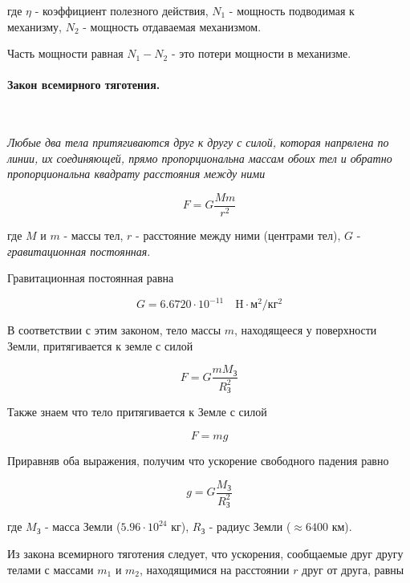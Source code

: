 \documentclass[a4paper,12pt]{article}
\begin{document}
		где $\eta$ - коэффициент полезного действия, $N_1$ - мощность подводимая к механизму, $N_2$ -
		мощность отдаваемая механизмом.

		Часть мощности равная $N_1-N_2$ - это потери мощности в механизме. 


		\paragraph{Закон всемирного тяготения.} \

		\textit{Любые два тела притягиваются друг к другу с силой, которая напрвлена по линии, их
		соединяющей, прямо пропорциональна массам обоих тел и обратно пропорциональна квадрату
		расстояния между ними}

		\begin{equation}
			F = G \frac{Mm}{r^2}
		\end{equation}

		где $M$ и $m$ - массы тел, $r$ - расстояние между ними (центрами тел), 
		$G$ - \textit{гравитационная постоянная}.

		Гравитационная постоянная равна

		\begin{equation*}
			G = 6.6720 \cdot 10^{-11} \quad \text{H} \cdot \text{м}^2 / \text{кг}^2
		\end{equation*}

		В соответствии с этим законом, тело массы $m$, находящееся у поверхности Земли, 
		притягивается к земле с силой

		\begin{equation*}
			F = G \frac{mM_\text{З}}{R^2_\text{З}}
		\end{equation*}

		Также знаем что тело притягивается к Земле с силой

		\begin{equation*}
			F = mg
		\end{equation*}
	
		Приравняв оба выражения, получим что ускорение свободного падения равно

		\begin{equation*}
			g = G \frac{M_\text{З}}{R^2_\text{З}}
		\end{equation*}

		где $M_\text{З}$ - масса Земли ($5.96 \cdot 10^{24}$ кг), $R_\text{З}$ - радиус Земли
		($\approx 6400$ км).

		Из закона всемирного тяготения следует, что ускорения, сообщаемые друг другу телами
		с массами $m_1$ и $m_2$, находящимися на расстоянии $r$ друг от друга, равны
\end{document}

